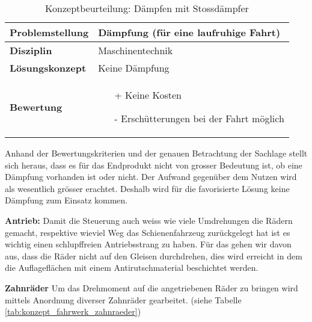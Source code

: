 \documentclass[../../main.tex]{subfiles}
\begin{document}
\begin{flushleft}
    \begin{table}[h]
    \begin{tabular}{ | l | p{11cm} |}
    \hline
    \textbf{Problemstellung} & Dämpfung (für eine laufruhige Fahrt) \\ \hline
    \textbf{Disziplin} & Maschinentechnik \\ \hline
    \textbf{Lösungskonzept} & Keine Dämpfung \\ \hline
    \textbf{Bewertung} &  \begin{itemize}
                            \item[+] Keine Kosten
                            \item[-] Erschütterungen bei der Fahrt möglich
                          \end{itemize} \\ \hline
    \end{tabular}
    \caption{Konzeptbeurteilung: Dämpfen mit Stossdämpfer}
    \label{tab:konzept_fahrwerk_keinedaempfung}
\end{table}
\end{flushleft}

Anhand der Bewertungskriterien und der genauen Betrachtung der Sachlage stellt sich heraus, dass es für das Endprodukt nicht von grosser Bedeutung ist, ob eine Dämpfung vorhanden ist oder nicht. Der Aufwand gegenüber dem Nutzen wird als wesentlich grösser erachtet. Deshalb wird für die favorisierte Lösung keine Dämpfung zum Einsatz kommen.


\textbf{Antrieb:}
Damit die Steuerung auch weiss wie viele Umdrehungen die Rädern gemacht, respektive wieviel Weg das Schienenfahrzeug zurückgelegt hat ist es wichtig einen schlupffreien Antriebsstrang zu haben. Für das gehen wir davon aus, dass die Räder nicht auf den Gleisen durchdrehen, dies wird erreicht in dem die Auflageflächen mit einem Antirutschmaterial beschichtet werden.

\textbf{Zahnräder}
Um das Drehmoment auf die angetriebenen Räder zu bringen wird mittels Anordnung diverser Zahnräder gearbeitet. (siehe Tabelle \ref{tab:konzept_fahrwerk_zahnraeder})
\end{document}
